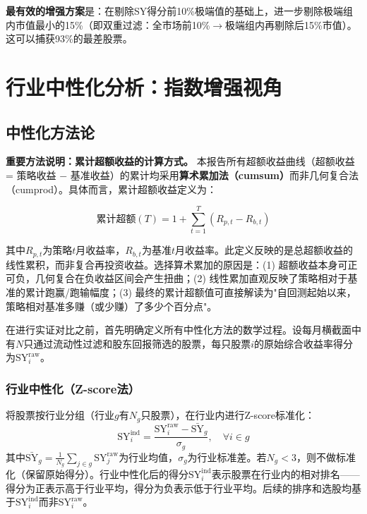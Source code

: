 \documentclass[10pt,a4paper]{ctexart}
\begin{document}
\textbf{最有效的增强方案}是：在剔除SY得分前10\%极端值的基础上，进一步剔除极端组内市值最小的15\%（即双重过滤：全市场前10\%$\rightarrow$极端组内再剔除后15\%市值）。这可以捕获93\%的最差股票。

\section{行业中性化分析：指数增强视角}

\subsection{中性化方法论}

\textbf{重要方法说明：累计超额收益的计算方式。} 本报告所有超额收益曲线（超额收益 = 策略收益 $-$ 基准收益）的累计均采用\textbf{算术累加法（cumsum）}而非几何复合法（cumprod）。具体而言，累计超额收益定义为：

\begin{equation}
\text{累计超额}(T) = 1 + \sum_{t=1}^{T} (R_{p,t} - R_{b,t})
\end{equation}

其中$R_{p,t}$为策略$t$月收益率，$R_{b,t}$为基准$t$月收益率。此定义反映的是总超额收益的线性累积，而非复合再投资收益。选择算术累加的原因是：(1) 超额收益本身可正可负，几何复合在负收益区间会产生扭曲；(2) 线性累加直观反映了策略相对于基准的累计跑赢/跑输幅度；(3) 最终的累计超额值可直接解读为"自回测起始以来，策略相对基准多赚（或少赚）了多少个百分点"。

在进行实证对比之前，首先明确定义所有中性化方法的数学过程。设每月横截面中有$N$只通过流动性过滤和股东回报筛选的股票，每只股票$i$的原始综合收益率得分为$\text{SY}_i^{\text{raw}}$。

\subsubsection{行业中性化（Z-score法）}

将股票按行业分组（行业$g$有$N_g$只股票），在行业内进行Z-score标准化：
\begin{equation}
\text{SY}_i^{\text{ind}} = \frac{\text{SY}_i^{\text{raw}} - \bar{\text{SY}}_g}{\sigma_g}, \quad \forall i \in g
\end{equation}
其中$\bar{\text{SY}}_g = \frac{1}{N_g}\sum_{j \in g} \text{SY}_j^{\text{raw}}$为行业均值，$\sigma_g$为行业标准差。若$N_g < 3$，则不做标准化（保留原始得分）。行业中性化后的得分$\text{SY}_i^{\text{ind}}$表示股票在行业内的相对排名——得分为正表示高于行业平均，得分为负表示低于行业平均。后续的排序和选股均基于$\text{SY}_i^{\text{ind}}$而非$\text{SY}_i^{\text{raw}}$。
\end{document}

